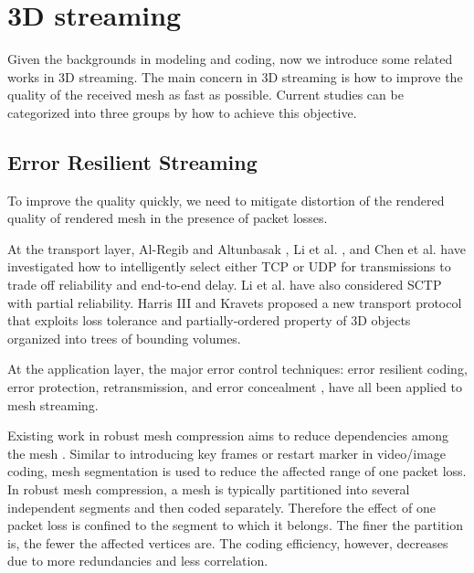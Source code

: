     \section{3D streaming}
    \label{s:related:streaming}
    Given the backgrounds in modeling and coding, now we introduce some
    related works in 3D streaming. 
    The main concern in 3D streaming is how to improve the quality of the received
    mesh as fast as possible. Current studies can be categorized into three groups
    by how to achieve this objective.
    
    \subsection{Error Resilient Streaming}
    To improve the quality quickly, we need to mitigate distortion of the 
    rendered quality of rendered mesh in the presence of packet losses.

    At the transport layer, Al-Regib and Altunbasak \cite{3tpregib}, Li
    et al. \cite{Li2006}, and Chen et al. \cite{chen05hybrid} have
    investigated how to intelligently select either TCP or UDP for
    transmissions to trade off reliability and end-to-end delay.  Li et
    al. have also considered SCTP with partial reliability.
    Harris III and Kravets \cite{harris:design} proposed a new
    transport protocol that exploits loss tolerance and
    partially-ordered property of 3D objects organized into trees of
    bounding volumes.

    At the application layer, the major error control techniques: error
    resilient coding, error protection, retransmission, and error
    concealment \cite{Park2003}, have all been applied to mesh streaming.  
    
    Existing work in robust mesh compression aims to
    reduce dependencies among the mesh \cite{error:Park,error:Yan}.
    Similar to introducing key frames or restart marker in video/image
    coding, mesh segmentation is used to reduce the affected range of one
    packet loss. In robust mesh compression, a mesh is typically
    partitioned into several independent segments and then coded separately.
    Therefore the effect of one packet loss is confined to the segment to which
    it belongs. The finer the partition is, the fewer the affected vertices
    are.  The coding efficiency, however, decreases
    due to more redundancies and less correlation.

